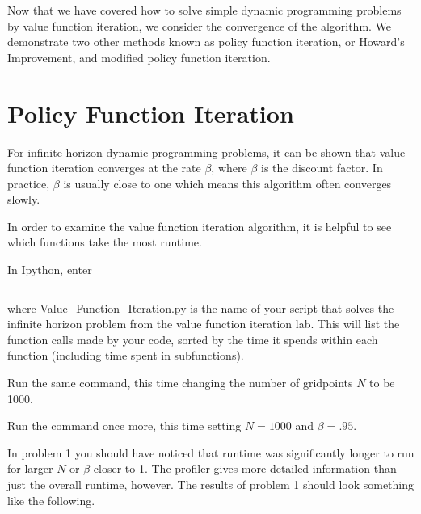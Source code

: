 

Now that we have covered how to solve simple dynamic programming problems by value function iteration, we consider the convergence of the algorithm.  We demonstrate two other methods known as policy function iteration, or Howard's Improvement, and modified policy function iteration.

\section*{Policy Function Iteration}
For infinite horizon dynamic programming problems, it can be shown that value function iteration converges at the rate $\beta$, where $\beta$ is the discount factor.  In practice, $\beta$ is usually close to one which means this algorithm often converges slowly.  

In order to examine the value function iteration algorithm, it is helpful to see which functions take the most runtime.

\begin{problem}
In Ipython, enter
\begin{lstlisting}[style=python]
%run -p -s cum Value_Function_Iteration.py
\end{lstlisting}
where Value\_Function\_Iteration.py is the name of your script that solves the infinite horizon problem from the value function iteration lab.  This will list the function calls made by your code, sorted by the time it spends within each function (including time spent in subfunctions).

Run the same command, this time changing the number of gridpoints $N$ to be 1000.

Run the command once more, this time setting $N=1000$ and $\beta = .95$.
\end{problem}

In problem 1 you should have noticed that runtime was significantly longer to run for larger $N$ or $\beta$ closer to 1.  The profiler gives more detailed information than just the overall runtime, however.  The results of problem 1 should look something like the following.

